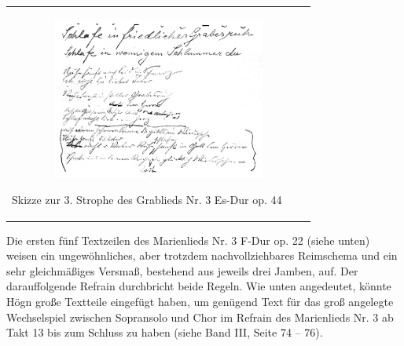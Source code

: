 \begin{center}
\begin{minipage}{10.264cm}
\begin{flushleft}
\tablefirsthead{}
\tablehead{}
\tabletail{}
\tablelasttail{}
\begin{supertabular}{m{10.064cm}}

\includegraphics[width=9.881cm,height=5.323cm]{pictures/zulassungsarbeit-img071.png}

Skizze zur 3. Strophe des Grablieds Nr.
3 Es-Dur op. 44\\
\end{supertabular}
\end{flushleft}
\end{minipage}
\end{center}
Die ersten fünf Textzeilen des Marienlieds Nr. 3 F-Dur op. 22 (siehe
unten) weisen ein ungewöhnliches, aber trotzdem nachvollziehbares
Reimschema und ein sehr gleichmäßiges Versmaß, bestehend aus jeweils
drei Jamben, auf. Der darauffolgende Refrain durchbricht beide Regeln.
Wie unten angedeutet, könnte Högn große Textteile eingefügt haben, um
genügend Text für das groß angelegte Wechselspiel zwischen Sopransolo
und Chor im Refrain des Marienlieds Nr. 3 ab Takt 13 bis zum Schluss zu
haben (siehe Band III, Seite 74 – 76).


